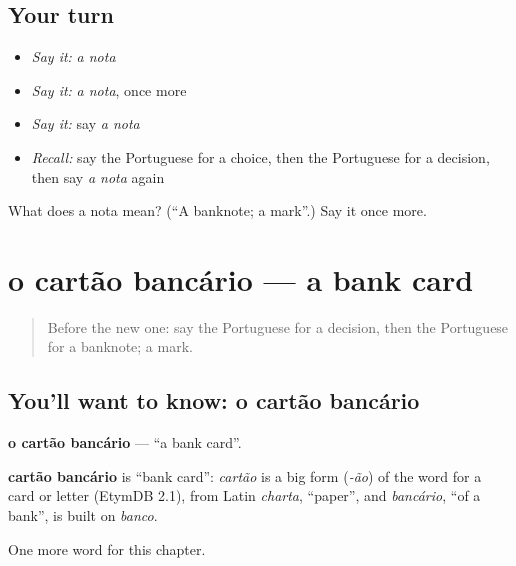 \subsection*{Your turn}
\begin{itemize}
\raggedright
  \item \emph{Say it:} \emph{a nota}
  \item \emph{Say it:} \emph{a nota}, once more
  \item \emph{Say it:} say \emph{a nota}
  \item \emph{Recall:} say the Portuguese for a choice, then the Portuguese for a decision, then say \emph{a nota} again
\end{itemize}

\begin{tcolorbox}[breakable,colback=teal!4,colframe=teal!35!black,title={Before you move on}]
What does a nota mean? (\textquotedblleft{}A banknote; a mark\textquotedblright{}.) Say it once more.
\end{tcolorbox}
\section[o cartão bancário]{o cartão bancário — a bank card}

\label{lesson:PT-C248-cartao-bancario}



\begin{quote}
Before the new one: say the Portuguese for a decision, then the Portuguese for a banknote; a mark.
\end{quote}

\subsection*{You'll want to know: o cartão bancário}
\textbf{o cartão bancário} — \textquotedblleft{}a bank card\textquotedblright{}.

\begin{cousinweb}
\textbf{cartão bancário} is \textquotedblleft{}bank card\textquotedblright{}: \emph{cartão} is a big form (\emph{-ão}) of the word for a card or letter (EtymDB 2.1), from Latin \emph{charta}, \textquotedblleft{}paper\textquotedblright{}, and \emph{bancário}, \textquotedblleft{}of a bank\textquotedblright{}, is built on \emph{banco}.
\end{cousinweb}

\begin{grammarlens}[title={What you've built}]
One more word for this chapter.
\end{grammarlens}

